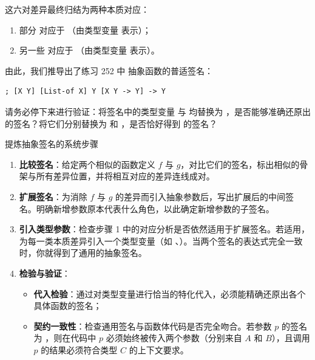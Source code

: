 这六对差异最终归结为两种本质对应：
\begin{enumerate}
  \item 部分  对应于 （由类型变量  表示）；
  \item 另一些  对应于 （由类型变量  表示）。
\end{enumerate}

由此，我们推导出了练习 252 中  抽象函数的普适签名：

\begin{lstlisting}[language=BSL]
; [X Y] [List-of X] Y [X Y -> Y] -> Y
\end{lstlisting}

\begin{notebox}[驻足验证类型实例化]
请务必停下来进行验证：将签名中的类型变量  与  均替换为 ，是否能够准确还原出  的签名？将它们分别替换为  和 ，是否恰好得到  的签名？
\end{notebox}

\begin{recipebox}{提炼抽象签名的系统步骤}
\begin{enumerate}
  \item \textbf{比较签名}：给定两个相似的函数定义 $f$ 与 $g$，对比它们的签名，标出相似的骨架与所有差异位置，并将相互对应的差异连线成对。
  \item \textbf{扩展签名}：为消除 $f$ 与 $g$ 的差异而引入抽象参数后，写出扩展后的中间签名。明确新增参数原本代表什么角色，以此确定新增参数的子签名。
  \item \textbf{引入类型参数}：检查步骤 1 中的对应分析是否依然适用于扩展签名。若适用，为每一类本质差异引入一个类型变量（如 、）。当两个签名的表达式完全一致时，你就得到了通用的抽象签名。
  \item \textbf{检验与验证}：
    \begin{itemize}
      \item \textbf{代入检验}：通过对类型变量进行恰当的特化代入，必须能精确还原出各个具体函数的签名；
      \item \textbf{契约一致性}：检查通用签名与函数体代码是否完全吻合。若参数 $p$ 的签名为 \code{[A B -> C]}，则在代码中 $p$ 必须始终被传入两个参数（分别来自 $A$ 和 $B$），且调用 $p$ 的结果必须符合类型 $C$ 的上下文要求。
    \end{itemize}
\end{enumerate}
\end{recipebox}


